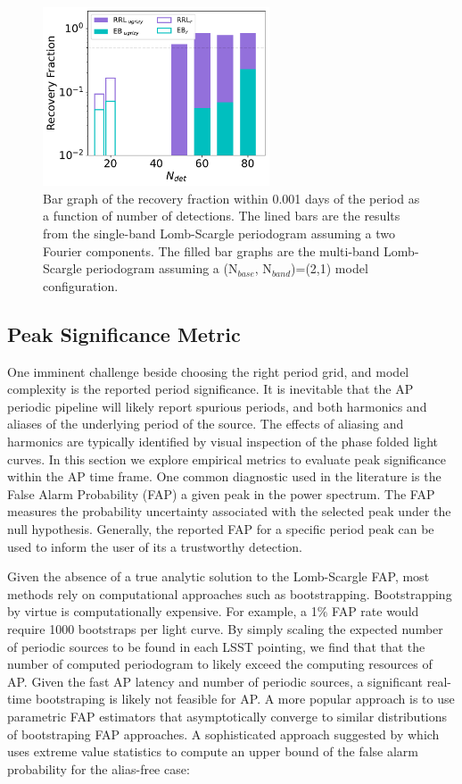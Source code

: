 \documentclass[DM,authoryear,toc]{lsstdoc}
\begin{document}
\begin{figure}
  \includegraphics[width=0.6\textwidth]{figures/multi_vs_single_rec_frac.pdf}
  \centering 
  \caption{Bar graph of the recovery fraction within 0.001 days of the period as a function of number of detections. The lined bars are the results from the single-band Lomb-Scargle periodogram assuming a two Fourier components. The filled bar graphs are the multi-band Lomb-Scargle periodogram assuming a (N$_{base}$, N$_{band}$)=(2,1) model configuration.}
  \label{fig:lspmulti}
\end{figure}

\subsection{Peak Significance Metric}
One imminent challenge beside choosing the right period grid, and model complexity is the reported period significance.
It is inevitable that the AP periodic pipeline will likely report spurious periods, and both harmonics and aliases of the underlying period of the source.
The effects of aliasing and harmonics are typically identified by visual inspection of the phase folded light curves.
In this section we explore empirical metrics to evaluate peak significance within the AP time frame.
One common diagnostic used in the literature is the False Alarm Probability (FAP) a given peak in the power spectrum.
The FAP measures the probability uncertainty associated with the selected peak under the null hypothesis.
Generally, the reported FAP for a specific period peak can be used to inform the user of its a trustworthy detection.


Given the absence of a true analytic solution to the Lomb-Scargle FAP, most methods rely on computational approaches such as bootstrapping.
Bootstrapping by virtue is computationally expensive.
For example, a 1$\%$ FAP rate would require 1000 bootstraps per light curve.
By simply scaling the expected number of periodic sources to be found in each LSST pointing, we find that that the number of computed periodogram to likely exceed the computing resources of AP.
Given the fast AP latency and number of periodic sources, a significant real-time bootstraping is likely not feasible for AP.
A more popular approach is to use parametric FAP estimators that asymptotically converge to similar distributions of bootstraping FAP approaches.
A sophisticated approach suggested by \citet{Baluev:Baluev2008} which uses extreme value statistics to compute an upper bound of the false alarm probability for the alias-free case:
\end{document}
